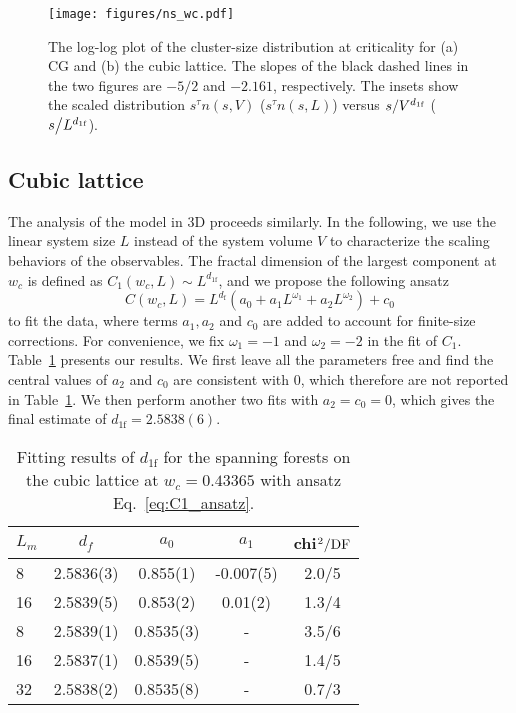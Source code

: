 \begin{figure}[h]
	\vspace{3ex}
	\centering
	\texttt{[image: figures/ns\_wc.pdf]}
	\caption{The log-log plot of the cluster-size distribution at criticality for (a) CG and (b) the cubic lattice. 
	The slopes of the black dashed lines in the two figures are $-5/2$ and $-2.161$, respectively. 
	The insets show the scaled distribution $s^{\tau} n(s, V)$ ($s^{\tau} n(s, L)$) versus $s/V^{{d_{1\textrm{f}}}}$ ($s\big/L^{{d_{1\textrm{f}}}}$).}
	\label{fig:ns_wc}
\end{figure}

\subsection{Cubic lattice}
The analysis of the model in 3D proceeds similarly. In the following, we use the linear system size $L$ instead of the system volume $V$
to characterize the scaling behaviors of the observables. The fractal dimension of the largest component at $w_c$ 
is defined as $C_1(w_c, L) \sim L^{d_{1\textrm{f}}}$, and we propose the following ansatz 
\begin{equation}\label{eq:C1_ansatz}
    C(w_c, L) = L^{d_{\textrm{f}}}(a_0 + a_1L^{\omega_1} +a_2 L^{\omega_2}) + c_0
\end{equation}
to fit the data, where terms $a_1, a_2$ and $c_0$ are added to account for finite-size corrections. For convenience, we fix $\omega_1 = -1$ and $\omega_2 = -2$ in the fit 
of $C_1$. 
Table~\ref{tab:C1_wc_3D} presents our results. We first leave all the parameters free and find the central values of
$a_2$ and $c_0$ are consistent with 0, which therefore are not reported in Table~\ref{tab:C1_wc_3D}. We then perform another two fits
with $a_2 = c_0 = 0$, which gives the final estimate of $d_{1\textrm{f}} = 2.5838(6)$.

\begin{table}[h]
\centering
 \vspace{3ex}
\caption{Fitting results of $d_{1\textrm{f}}$ for the spanning forests on the cubic lattice at $w_c = 0.43365$ with ansatz Eq.~\eqref{eq:C1_ansatz}.}
\label{tab:C1_wc_3D} 
\begin{tabular}{|lcccc|}
\hline 
$L_{m}$   &$d_f$   &$a_0$   &$a_1$    & chi$^2/{\rm DF}$     \\
\hline 
8     &2.5836(3)    &0.855(1)   &-0.007(5)  &2.0/5\\ 
16    &2.5839(5)    &0.853(2)   &0.01(2)    &1.3/4\\ 
8     &2.5839(1)    &0.8535(3)  &-          &3.5/6\\ 
16    &2.5837(1)    &0.8539(5)  &-          &1.4/5\\ 
32    &2.5838(2)    &0.8535(8)  &-          &0.7/3\\ 
\hline 
\end{tabular} 
 \vspace{3ex}
\end{table} 


